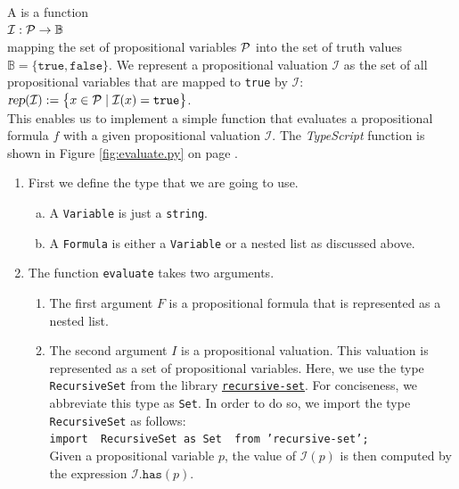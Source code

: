 A  is a function  
\\[0.2cm]
\hspace*{1.3cm} ${\cal I}: {\cal P} \rightarrow \mathbb{B}$ \\[0.2cm]
mapping the set of propositional variables ${\cal P}$ into the set of truth values
$\mathbb{B} = \bigl\{ \mathtt{true}, \mathtt{false} \bigr\}$.
We represent a propositional valuation $\mathcal{I}$ as the set of all propositional variables that are mapped
to \texttt{true} by $\mathcal{I}$:
\\[0.2cm]
\hspace*{1.3cm}
$\textsl{rep}(\mathcal{I}) := \bigl\{ x \in \mathcal{P} \mid \mathcal{I}(x) = \texttt{true} \bigr\}$.
\\[0.2cm]
This enables us to implement a simple function that evaluates a propositional formula $f$ with a given
propositional valuation $\mathcal{I}$.
The \textsl{TypeScript} function  is shown in Figure \ref{fig:evaluate.py} on page
\pageref{fig:evaluate.py}. 

\begin{enumerate}
\item First we define the type that we are going to use.
      \begin{enumerate}[(a)]
      \item A \texttt{Variable} is just a \texttt{string}.
      \item A \texttt{Formula} is either a \texttt{Variable} or a nested list as discussed above.
      \end{enumerate}
\item The function \texttt{evaluate} takes two arguments.
      \begin{enumerate}
      \item The first argument $F$ is a propositional formula that is represented as a nested list.
      \item The second argument $I$ is a propositional valuation.  This valuation is represented as a set of
        propositional variables. Here, we use the type \texttt{RecursiveSet} from the library
        \href{https://github.com/cstrerath/recursive-set}{\texttt{recursive-set}}.  For conciseness,  we abbreviate
        this type as \texttt{Set}.  In order to do so, we import the type \texttt{RecursiveSet} as follows:
        \\[0.2cm]
        \hspace*{1.3cm}
        \texttt{import { RecursiveSet as Set } from 'recursive-set';}
        \\[0.2cm]
        Given a propositional variable $p$, the value of $\mathcal{I}(p)$ is then computed
        by the expression  $\mathcal{I}\mathtt{.has}(p)$.
      \end{enumerate}
\end{enumerate}

